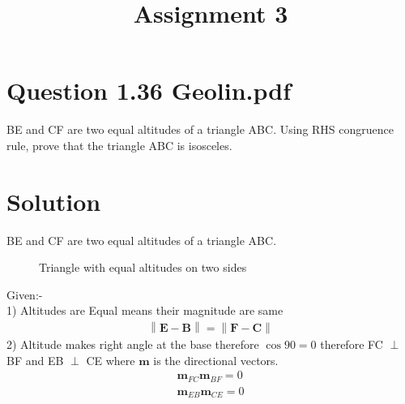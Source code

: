 \documentclass[journal,12pt,twocolumn]{IEEEtran}
\let\vec\mathbf
\newcommand{\norm}[1]{\left\lVert#1\right\rVert}
\begin{document}
\title{Assignment 3}

\author{}
\maketitle
\section{Question 1.36 Geolin.pdf }
BE and CF are two equal altitudes of a triangle ABC. Using RHS congruence rule, prove that the triangle ABC is isosceles.
\section{Solution}

BE and CF are two equal altitudes of a triangle ABC.
\captionsetup{justification=centering}

\begin{figure}[!h]
\centering
\resizebox{.5\columnwidth}{!}
{
}
\caption{Triangle with equal altitudes on two sides}
\label{myfig}
\end{figure}
Given:-\\
1) Altitudes are Equal means their magnitude are same
 \begin{align}
 	\norm{\vec{E} - \vec{B}} = \norm{\vec{F} - \vec{C}} \label{1}
 \end{align}
2) Altitude makes right angle at the base therefore $\cos 90 =0$ therefore  FC $\perp$ BF and EB $\perp$ CE where $\textbf{m}$ is the directional vectors.
\begin{align}
\textbf{m}_{FC} \textbf{m}_{BF} = 0 \label{2}\\
\textbf{m}_{EB} \textbf{m}_{CE} = 0 \label{3}
\end{align}
\end{document}

